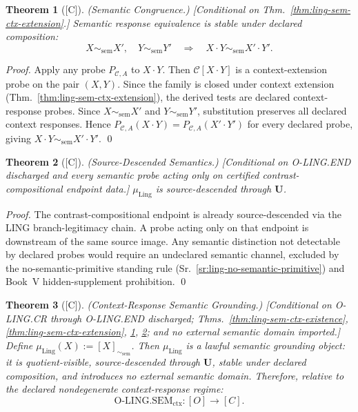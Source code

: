 \documentclass[12pt,oneside]{amsbook}
\theoremstyle{plain}
\newtheorem{theorem}{Theorem}[section]
\theoremstyle{definition}
\theoremstyle{remark}
\newcommand{\status}[1]{\textup{[#1]}}
\begin{document}
\begin{theorem}[\status{C}]\label{thm:ling-sem-ctx-congruence}
\textup{(Semantic Congruence.)}
\textup{[Conditional on Thm.~\ref{thm:ling-sem-ctx-extension}.]}
Semantic response equivalence is stable under declared composition:
\[
 X \sim_{\mathrm{sem}} X',\quad Y \sim_{\mathrm{sem}} Y'
 \quad\Rightarrow\quad X \cdot Y \sim_{\mathrm{sem}} X' \cdot Y'.
\]
\end{theorem}

\begin{proof}
Apply any probe $P_{\mathcal{C},A}$ to $X \cdot Y$. Then
$\mathcal{C}[X \cdot Y]$ is a context-extension probe on the pair
$(X,Y)$. Since the family is closed under context extension
(Thm.~\ref{thm:ling-sem-ctx-extension}), the derived tests are
declared context-response probes. Since $X \sim_{\mathrm{sem}} X'$
and $Y \sim_{\mathrm{sem}} Y'$, substitution preserves all declared
context responses. Hence $P_{\mathcal{C},A}(X \cdot Y) =
P_{\mathcal{C},A}(X' \cdot Y')$ for every declared probe, giving
$X \cdot Y \sim_{\mathrm{sem}} X' \cdot Y'$.
\qed
\end{proof}

\begin{theorem}[\status{C}]\label{thm:ling-sem-source-descended}
\textup{(Source-Descended Semantics.)}
\textup{[Conditional on O-LING.END discharged and every semantic
probe acting only on certified contrast-compositional endpoint data.]}
$\mu_{\mathrm{Ling}}$ is source-descended through $\mathbf{U}$.
\end{theorem}

\begin{proof}
The contrast-compositional endpoint is already source-descended via
the LING branch-legitimacy chain. A probe acting only on that
endpoint is downstream of the same source image. Any semantic
distinction not detectable by declared probes would require an
undeclared semantic channel, excluded by the no-semantic-primitive
standing rule (Sr.~\ref{sr:ling-no-semantic-primitive}) and Book~V
hidden-supplement prohibition.
\qed
\end{proof}

\begin{theorem}[\status{C}]\label{thm:ling-sem-context-grounding}
\textup{(Context-Response Semantic Grounding.)}
\textup{[Conditional on O-LING.CR through O-LING.END discharged;
Thms.~\ref{thm:ling-sem-ctx-existence}, \ref{thm:ling-sem-ctx-extension},
\ref{thm:ling-sem-ctx-congruence}, \ref{thm:ling-sem-source-descended};
and no external semantic domain imported.]}
Define $\mu_{\mathrm{Ling}}(X) := [X]_{\sim_{\mathrm{sem}}}$.
Then $\mu_{\mathrm{Ling}}$ is a lawful semantic grounding object:
it is quotient-visible, source-descended through $\mathbf{U}$,
stable under declared composition, and introduces no external semantic
domain. Therefore, relative to the declared nondegenerate
context-response regime:
\[
 \mathrm{O\text{-}LING.SEM}_{\mathrm{ctx}} : [O] \to [C].
\]
\end{theorem}
\end{document}
